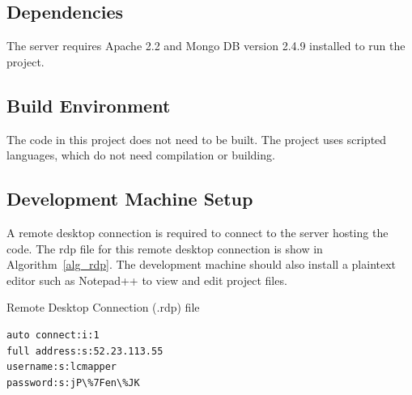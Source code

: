 \subsection{Dependencies}
The server requires Apache 2.2 and Mongo DB version 2.4.9 installed to run the project.

\subsection{Build  Environment}
The code in this project does not need to be built. The project uses scripted languages, which do not need compilation or building. 

\subsection{Development Machine Setup}
A remote desktop connection is required to connect to the server hosting the code. The rdp file for this remote desktop connection is show in Algorithm~\ref{alg_rdp}. The development machine should also install a plaintext editor such as Notepad++ to view and edit project files. 
\begin{algorithm} [tbh]                     
\caption{Remote Desktop Connection (.rdp) file}
\label{alg_rdp}    
\begin{lstlisting}
auto connect:i:1
full address:s:52.23.113.55
username:s:lcmapper
password:s:jP\%7Fen\%JK
\end{lstlisting}
\end{algorithm}


